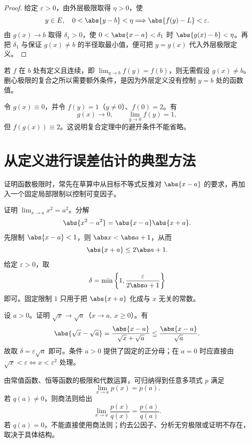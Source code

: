 \begin{proof}
给定 \(\varepsilon>0\)，由外层极限取得 \(\eta>0\)，使
\[
 y\in E,\quad0<\abs{y-b}<\eta
 \Longrightarrow\abs{f(y)-L}<\varepsilon.
\]
由 \(g(x)\to b\) 取得 \(\delta_1>0\)，使 \(0<\abs{x-a}<\delta_1\) 时 \(\abs{g(x)-b}<\eta\)。再把 \(\delta_1\) 与保证 \(g(x)\ne b\) 的半径取最小值，便可把 \(y=g(x)\) 代入外层极限定义。
\end{proof}

若 \(f\) 在 \(b\) 处有定义且连续，即 \(\lim_{y\to b}f(y)=f(b)\)，则无需假设 \(g(x)\ne b\)。删心极限的复合之所以需要额外条件，是因为外层定义没有控制 \(y=b\) 处的函数值。

\begin{counterexample}
令 \(g(x)\equiv0\)，并令 \(f(y)=1\)（\(y\ne0\)）、\(f(0)=2\)。有
\[
 g(x)\to0,\qquad \lim_{y\to0}f(y)=1,
\]
但 \(f(g(x))\equiv2\)。这说明复合定理中的避开条件不能省略。
\end{counterexample}

\section{从定义进行误差估计的典型方法}

证明函数极限时，常先在草算中从目标不等式反推对 \(\abs{x-a}\) 的要求，再加入一个固定局部限制以控制可变因子。

\begin{example}[平方函数]
证明 \(\lim_{x\to a}x^2=a^2\)。分解
\[
 \abs{x^2-a^2}=\abs{x-a}\abs{x+a}.
\]
先限制 \(\abs{x-a}<1\)，则 \(\abs x<\abs a+1\)，从而
\[
 \abs{x+a}\le2\abs a+1.
\]
给定 \(\varepsilon>0\)，取
\[
 \delta=\min\left\{1,\frac{\varepsilon}{2\abs a+1}\right\}
\]
即可。固定限制 \(1\) 只用于把 \(\abs{x+a}\) 化成与 \(x\) 无关的常数。
\end{example}

\begin{example}[根式有理化]
设 \(a>0\)。证明 \(\sqrt{x}\to\sqrt a\)（\(x\to a,\ x\ge0\)）。有
\[
 \abs{\sqrt x-\sqrt a}
 =\frac{\abs{x-a}}{\sqrt x+\sqrt a}
 \le\frac{\abs{x-a}}{\sqrt a}.
\]
故取 \(\delta=\varepsilon\sqrt a\) 即可。条件 \(a>0\) 提供了固定的正分母；在 \(a=0\) 时应直接由 \(\sqrt x<\varepsilon\Longleftrightarrow x<\varepsilon^2\) 处理。
\end{example}

\begin{example}[多项式与有理函数]
由常值函数、恒等函数的极限和代数运算，可归纳得到任意多项式 \(p\) 满足
\[
 \lim_{x\to a}p(x)=p(a).
\]
若 \(q(a)\ne0\)，则商法则给出
\[
 \lim_{x\to a}\frac{p(x)}{q(x)}=\frac{p(a)}{q(a)}.
\]
若 \(q(a)=0\)，不能直接使用商法则；约去公因子、分析无穷极限或证明不存在，取决于具体结构。
\end{example}

